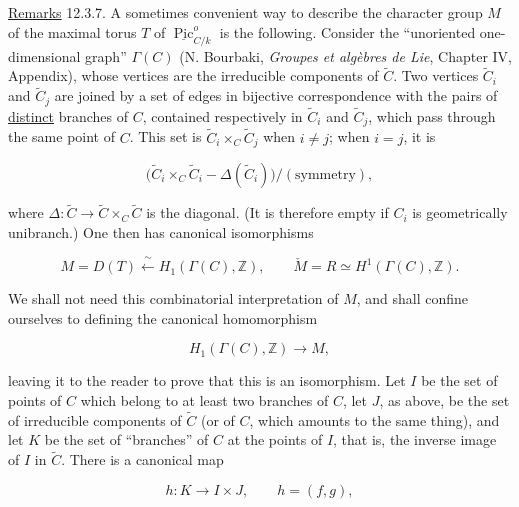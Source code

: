 \medskip
\noindent
\underline{Remarks} 12.3.7. A sometimes convenient way to describe the
character group $M$ of the maximal torus $T$ of
$\underline{\operatorname{Pic}}^o_{C/k}$ is the following. Consider the
``unoriented one-dimensional graph'' $\Gamma(C)$ (N. Bourbaki,
\emph{Groupes et alg\`ebres de Lie}, Chapter IV, Appendix), whose vertices
are the irreducible components of $\widetilde C$. Two vertices
$\widetilde C_i$ and $\widetilde C_j$ are joined by a set of edges in
bijective correspondence with the pairs of \underline{distinct} branches
of $C$, contained respectively in $\widetilde C_i$ and
$\widetilde C_j$, which pass through the same point of $C$. This set is
$\widetilde C_i\times_C\widetilde C_j$ when $i\neq j$; when $i=j$, it is

\begin{equation*}
 \bigl(\widetilde C_i\times_C\widetilde C_i-
       \Delta(\widetilde C_i)\bigr)/(\text{symmetry}),
\end{equation*}

\noindent
where $\Delta:\widetilde C\to\widetilde C\times_C\widetilde C$ is the
diagonal. (It is therefore empty if $C_i$ is geometrically unibranch.) One
then has canonical isomorphisms

\begin{equation}\tag{12.3.7}
 M=D(T)\xleftarrow{\ \sim\ }H_1(\Gamma(C),\mathbb Z),
 \qquad
 \check M=R\simeq H^1(\Gamma(C),\mathbb Z).
\end{equation}

We shall not need this combinatorial interpretation of $M$, and shall
confine ourselves to defining the canonical homomorphism

\begin{equation}\tag{12.3.8}
 H_1(\Gamma(C),\mathbb Z)\longrightarrow M,
\end{equation}

\noindent
leaving it to the reader to prove that this is an isomorphism. Let $I$ be
the set of points of $C$ which belong to at least two branches of $C$,
let $J$, as above, be the set of irreducible components of $\widetilde C$
(or of $C$, which amounts to the same thing), and let $K$ be the set of
``branches'' of $C$ at the points of $I$, that is, the inverse image of
$I$ in $\widetilde C$. There is a canonical map

\begin{equation}\tag{12.3.9}
 h:K\longrightarrow I\times J,
 \qquad h=(f,g),
\end{equation}

